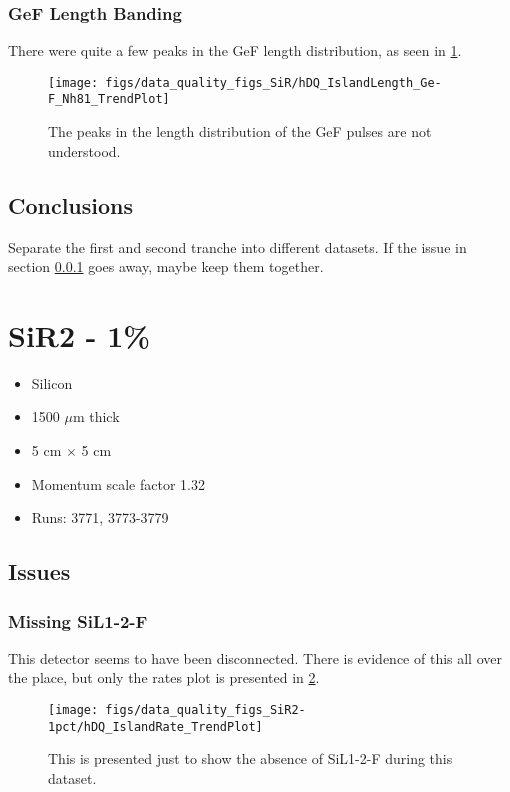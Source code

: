 \documentclass[a4paper]{article}
\begin{document}
\subsubsection{GeF Length Banding}
\label{sec:sir_gefbands}
There were quite a few peaks in the GeF length distribution, as seen in \ref{fig:sir_gef_length}.

\begin{figure}
  \centering
  \texttt{[image: figs/data\_quality\_figs\_SiR/hDQ\_IslandLength\_Ge-F\_Nh81\_TrendPlot]}
  \caption{The peaks in the length distribution of the GeF pulses
    are not understood.}
  \label{fig:sir_gef_length}
\end{figure}


\subsection{Conclusions}

Separate the first and second tranche into different datasets. If the issue in section \ref{sec:sir_gefbands}
goes away, maybe keep them together.



\section{SiR2 - 1\%}
\begin{itemize}
  \item Silicon
  \item 1500 $\mu$m thick
  \item 5 cm $\times$ 5 cm
  \item Momentum scale factor 1.32
  \item Runs:
    3771, 3773-3779
\end{itemize}

\subsection{Issues}
\subsubsection{Missing SiL1-2-F}
\label{sec:sir1pct_missing_det}
This detector seems to have been disconnected. There is evidence of this all over the place, but only the rates plot is
presented in \ref{fig:sir1pct_rates}.

\begin{figure}
  \centering
  \texttt{[image: figs/data\_quality\_figs\_SiR2-1pct/hDQ\_IslandRate\_TrendPlot]}
  \caption{This is presented just to show the absence of SiL1-2-F during this dataset.}
  \label{fig:sir1pct_rates}
\end{figure}
\end{document}
